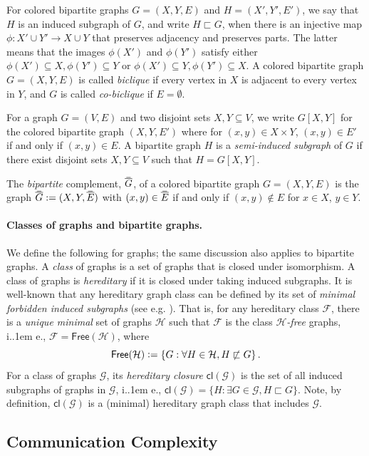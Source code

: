 \documentclass{article}
\makeatletter
\newcommand{\define}{\vcentcolon=}
\newcommand{\cF}{\ensuremath{\mathcal{F}}}
\newcommand{\cG}{\ensuremath{\mathcal{G}}}
\newcommand{\cH}{\ensuremath{\mathcal{H}}}
\newcommand*\ie{i.\kern.1em e.\@\xspace} %
\newcommand\doverline[1]{%
  \setbox0=\hbox{$\!\overline{#1}\!$}%
  \ht0=\dimexpr\ht0-.2ex\relax%
  \,\overline{\copy0}\,%
}
\newcommand{\bc}[1]{\doverline{#1}} %
\newcommand{\cl}{\mathsf{cl}}
\newcommand{\free}{\mathsf{Free}}
\makeatother
\begin{document}
For colored bipartite graphs $G = (X,Y,E)$ and $H = (X',Y',E')$, we say that $H$ is an induced
subgraph of $G$, and write $H \sqsubset G$, when there is an injective map $\phi : X' \cup Y' \to X
\cup Y$ that preserves adjacency and preserves parts. The latter means that the images $\phi(X')$
and $\phi(Y')$ satisfy either $\phi(X') \subseteq X, \phi(Y') \subseteq Y$ or $\phi(X') \subseteq Y,
\phi(Y') \subseteq X$.  A colored bipartite graph $G = (X,Y,E)$ is called \emph{biclique} if every
vertex in $X$ is adjacent to every vertex in $Y$, and $G$ is called \emph{co-biclique} if $E =
\emptyset$.

For a graph $G=(V,E)$ and two disjoint sets $X,Y \subseteq V$, we write $G[X,Y]$ for the colored bipartite graph $(X,Y,E')$ where for $(x,y) \in X \times Y$, $(x,y) \in E'$ if and only if $(x,y) \in E$. A bipartite graph $H$ is a \emph{semi-induced subgraph} of $G$ if there exist disjoint sets $X,Y \subseteq V$ such that $H = G[X,Y]$.

The \emph{bipartite} complement, $\bc{G}$,
of a colored bipartite graph $G=(X,Y,E)$ is the graph $\bc{G} := (X,Y,\bc{E})$ with $(x,y)\in \bc{E}$ if and only if $(x,y)\notin E$ for $x\in X$, $y\in Y$.

\paragraph{Classes of graphs and bipartite graphs.} We define the following for graphs; the same
discussion also applies to bipartite graphs. A \emph{class} of graphs is a set of graphs that is
closed under isomorphism. A class of graphs is \emph{hereditary} if it is closed under taking
induced subgraphs.  It is well-known that any hereditary graph class can be defined by its set of
\emph{minimal forbidden induced subgraphs} (see e.g. \cite[Theorem 2.1.3]{KL15}). That is, for any hereditary class $\cF$, there is a
\emph{unique minimal} set of graphs $\cH$ such that $\cF$ is the class \emph{$\cH$-free} graphs,
\ie, $\cF = \free(\cH)$, where
\[
\free(\cH) \define \{ G : \forall H \in \cH, H \not\sqsubset G \} \,.
\]
For a class of  graphs $\cG$, its \emph{hereditary closure} $\cl(\cG)$ is the set of all induced
subgraphs of graphs in $\cG$, \ie, $\cl(\cG) = \{ H : \exists G \in \cG, H \sqsubset G \}$. Note, by
definition, $\cl(\cG)$ is a (minimal) hereditary graph class that includes $\cG$.






\subsection{Communication Complexity}
\label{section:prelim cc}
\end{document}
